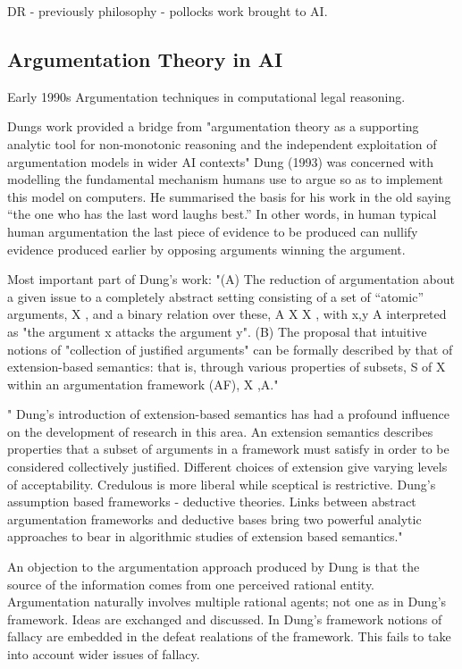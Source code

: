 DR - previously philosophy - pollocks work brought to AI.



\subsection{Argumentation Theory in AI}

Early 1990s Argumentation techniques in computational legal reasoning.



Dungs work provided a bridge from "argumentation theory as a supporting analytic
tool for non-monotonic reasoning and the independent exploitation of argumentation models in wider AI contexts"
Dung (1993) was concerned with modelling the fundamental mechanism humans use to argue so as to implement this model on computers. He summarised the basis for his work in the old saying “the one who has the last word laughs best.” In other words, in human typical human argumentation the last piece of evidence to be produced can nullify evidence produced earlier by opposing arguments winning the argument.

Most important part of Dung's work:
"(A) The reduction of argumentation about a given issue to a completely abstract setting consisting of a set of “atomic”
arguments, X , and a binary relation over these, A  X  X , with x,y  A interpreted as "the argument x
attacks the argument y".
(B) The proposal that intuitive notions of "collection of justified arguments" can be formally described by that of
extension-based semantics: that is, through various properties of subsets, S of X within an argumentation framework
(AF), X ,A."

"
Dung's introduction of extension-based semantics has had a profound influence on the development of research in this area.
An extension semantics describes properties that a subset of arguments in a framework must satisfy in order to be considered collectively justified.
Different choices of extension give varying levels of acceptability. Credulous is more liberal while sceptical is restrictive.
Dung's assumption based frameworks - deductive theories.
Links between abstract argumentation frameworks and deductive bases bring two powerful analytic approaches to bear in algorithmic studies of extension based semantics."

An objection to the argumentation approach produced by Dung is that the source of the information comes from one perceived rational entity.
Argumentation naturally involves multiple rational agents; not one as in Dung's framework. Ideas are exchanged and discussed.
In Dung's framework notions of fallacy are embedded in the defeat realations of the framework. This fails to take into account wider issues of fallacy.


